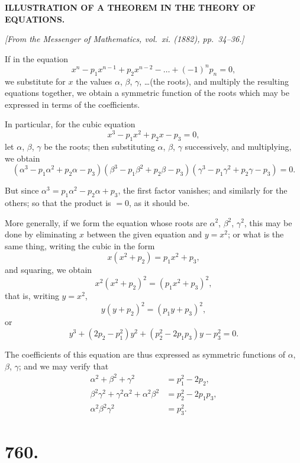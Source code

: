 \documentclass[11pt,a4paper]{book}
\begin{document}
\begin{center}
\textbf{ILLUSTRATION OF A THEOREM IN THE THEORY OF EQUATIONS.}
\end{center}

\begin{flushright}
\textit{[From the Messenger of Mathematics, vol.~xi. (1882), pp.~34--36.]}
\end{flushright}

If in the equation
%
\[
x^n - p_1 x^{n-1} + p_2 x^{n-2} - \ldots + (-1)^n p_n = 0,
\]
we substitute for $x$ the values $\alpha$, $\beta$, $\gamma$, \ldots (the roots), and multiply
the resulting equations together, we obtain a symmetric function of the roots
which may be expressed in terms of the coefficients.

In particular, for the cubic equation
%
\[
x^3 - p_1 x^2 + p_2 x - p_3 = 0,
\]
let $\alpha$, $\beta$, $\gamma$ be the roots; then substituting $\alpha$, $\beta$, $\gamma$ successively,
and multiplying, we obtain
%
\[
(\alpha^3 - p_1 \alpha^2 + p_2 \alpha - p_3)
(\beta^3 - p_1 \beta^2 + p_2 \beta - p_3)
(\gamma^3 - p_1 \gamma^2 + p_2 \gamma - p_3) = 0.
\]

But since $\alpha^3 = p_1 \alpha^2 - p_2 \alpha + p_3$, the first factor vanishes; and similarly
for the others; so that the product is $=0$, as it should be.

More generally, if we form the equation whose roots are $\alpha^2$, $\beta^2$, $\gamma^2$,
this may be done by eliminating $x$ between the given equation and $y = x^2$;
or what is the same thing, writing the cubic in the form
%
\[
x(x^2 + p_2) = p_1 x^2 + p_3,
\]
%
and squaring, we obtain
%
\[
x^2 (x^2 + p_2)^2 = (p_1 x^2 + p_3)^2,
\]
%
that is, writing $y = x^2$,
%
\[
y(y + p_2)^2 = (p_1 y + p_3)^2,
\]
%
or
%
\[
y^3 + (2p_2 - p_1^2) y^2 + (p_2^2 - 2p_1 p_3) y - p_3^2 = 0.
\]

The coefficients of this equation are thus expressed as symmetric functions
of $\alpha$, $\beta$, $\gamma$; and we may verify that
%
\begin{align*}
\alpha^2 + \beta^2 + \gamma^2 &= p_1^2 - 2p_2, \\
\beta^2\gamma^2 + \gamma^2\alpha^2 + \alpha^2\beta^2 &= p_2^2 - 2p_1 p_3, \\
\alpha^2 \beta^2 \gamma^2 &= p_3^2.
\end{align*}

\newpage


\section*{760.}
\end{document}
